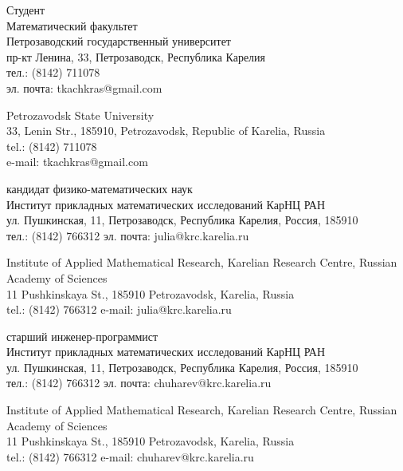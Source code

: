 \documentclass{article}
\begin{document}
\begin{aboutauthors}
Студент\\
Математический факультет\\ 
Петрозаводский государственный университет\\
пр-кт Ленина, 33, Петрозаводск, Республика Карелия\\
тел.: (8142) 711078\\
эл. почта: tkachkras@gmail.com

\columnbreak

Petrozavodsk State University\\
33, Lenin Str., 185910, Petrozavodsk, Republic of Karelia, Russia\\
tel.: (8142) 711078\\
e-mail: tkachkras@gmail.com 
\end{aboutauthors}

\begin{aboutauthors}
кандидат физико-математических наук\\ 
Институт прикладных математических исследований КарНЦ РАН\\ 
ул. Пушкинская, 11, Петрозаводск, Республика Карелия, Россия, 185910\\
тел.: (8142) 766312
эл. почта: julia@krc.karelia.ru

\columnbreak

Institute of Applied Mathematical Research, Karelian Research Centre, Russian Academy of Sciences\\
11 Pushkinskaya St., 185910 Petrozavodsk, Karelia, Russia\\
tel.: (8142) 766312
e-mail: julia@krc.karelia.ru
\end{aboutauthors}

\begin{aboutauthors}
старший инженер-программист\\ 
Институт прикладных математических исследований КарНЦ РАН\\ 
ул. Пушкинская, 11, Петрозаводск, Республика Карелия, Россия, 185910\\
тел.: (8142) 766312
эл. почта: chuharev@krc.karelia.ru

\columnbreak

Institute of Applied Mathematical Research, Karelian Research Centre, Russian Academy of Sciences\\
11 Pushkinskaya St., 185910 Petrozavodsk, Karelia, Russia\\
tel.: (8142) 766312
e-mail: chuharev@krc.karelia.ru
\end{aboutauthors}
\end{document}
